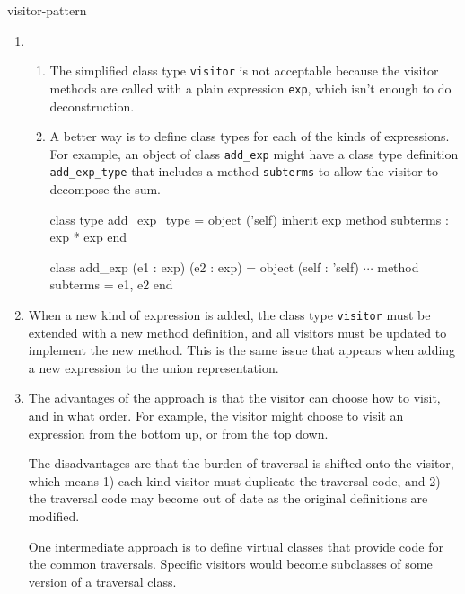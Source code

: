 \begin{exercise}{visitor-pattern}
\begin{answer}\ifanswers
\begin{enumerate}
\item

\begin{enumerate}
\item
The simplified class type \hbox{\lstinline$visitor$} is not acceptable because the
visitor methods are called with a plain expression \hbox{\lstinline$exp$}, which
isn't enough to do deconstruction.

\item

A better way is to define class types for each of the kinds of
expressions.  For example, an object of class \hbox{\lstinline$add_exp$}
might have a class type definition \hbox{\lstinline$add_exp_type$} that
includes a method \hbox{\lstinline$subterms$} to allow the visitor to
decompose the sum.

\begin{ocaml}
class type add_exp_type =
  object ('self)
    inherit exp
    method subterms : exp * exp
  end

class add_exp (e1 : exp) (e2 : exp) =
  object (self : 'self)
    $\cdots$
    method subterms = e1, e2
  end
\end{ocaml}
\end{enumerate}

\item

When a new kind of expression is added, the class type \lstinline$visitor$ must
be extended with a new method definition, and all visitors must be updated
to implement the new method.  This is the same issue that appears when adding
a new expression to the union representation.

\item 

The advantages of the approach is that the visitor can choose how to visit,
and in what order.  For example, the visitor might choose to visit an
expression from the bottom up, or from the top down.

The disadvantages are that the burden of traversal is shifted onto the
visitor, which means 1) each kind visitor must duplicate the traversal code,
and 2) the traversal code may become out of date as the original definitions
are modified.

One intermediate approach is to define virtual classes that provide
code for the common traversals.  Specific visitors would become
subclasses of some version of a traversal class.


\end{enumerate}
\end{answer}
\end{exercise}
